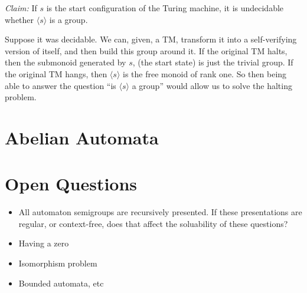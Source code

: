 \documentclass[11pt]{article}
\begin{document}
\textit{Claim:} If $s$ is the start configuration of the Turing
machine, it is undecidable whether $\langle s \rangle$ is a group.

Suppose it was decidable. We can, given, a TM, transform it into a
self-verifying version of itself, and then build this group around
it. If the original TM halts, then the submonoid generated by $s$,
(the start state) is just the trivial group. If the original TM hangs,
then $\langle s \rangle$ is the free monoid of rank one. So then being
able to answer the question ``is $\langle s \rangle $ a group'' would
allow us to solve the halting problem.

\section{Abelian Automata}

\section{Open Questions}

\begin{itemize}
\item All automaton semigroups are recursively presented. If these
  presentations are regular, or context-free, does that affect the
  soluability of these questions?
\item Having a zero
\item Isomorphism problem
\item Bounded automata, etc
\end{itemize}

\nocite{*}

\end{document}
